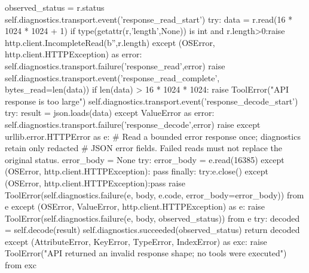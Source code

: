                 observed_status = r.status
                self.diagnostics.transport.event('response_read_start')
                try:
                    data = r.read(16 * 1024 * 1024 + 1)
                    if type(getattr(r,'length',None)) is int and r.length>0:raise http.client.IncompleteRead(b'',r.length)
                except (OSError, http.client.HTTPException) as error:
                    self.diagnostics.transport.failure('response_read',error)
                    raise
                self.diagnostics.transport.event('response_read_complete', bytes_read=len(data))
            if len(data) > 16 * 1024 * 1024:
                raise ToolError("API response is too large")
            self.diagnostics.transport.event('response_decode_start')
            try:
                result = json.loads(data)
            except ValueError as error:
                self.diagnostics.transport.failure('response_decode',error)
                raise
        except urllib.error.HTTPError as e:
            # Read a bounded error response once; diagnostics retain only redacted
            # JSON error fields. Failed reads must not replace the original status.
            error_body = None
            try:
                error_body = e.read(16385)
            except (OSError, http.client.HTTPException):
                pass
            finally:
                try:e.close()
                except (OSError, http.client.HTTPException):pass
            raise ToolError(self.diagnostics.failure(e, body, e.code, error_body=error_body)) from e
        except (OSError, ValueError, http.client.HTTPException) as e:
            raise ToolError(self.diagnostics.failure(e, body, observed_status)) from e
        try:
            decoded = self.decode(result)
            self.diagnostics.succeeded(observed_status)
            return decoded
        except (AttributeError, KeyError, TypeError, IndexError) as exc:
            raise ToolError("API returned an invalid response shape; no tools were executed") from exc

